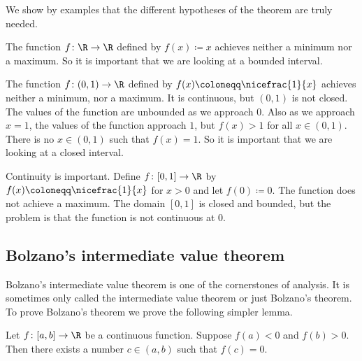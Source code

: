 We show by examples that the different hypotheses of the theorem are
truly needed.

\begin{example}
The function $f \colon \R \to \R$ defined by $f(x) \coloneqq x$
achieves neither a minimum nor a maximum.  So it is important that
we are looking at a bounded interval.
\end{example}

\begin{example}
The function $f \colon (0,1) \to \R$ defined by $f(x) \coloneqq \nicefrac{1}{x}$
achieves neither a minimum, nor a maximum.
It is continuous, but $(0,1)$ is not closed.
The values of the function are
unbounded as we approach $0$.  Also as we approach $x=1$, the values of the
function approach $1$, but $f(x) > 1$ for all $x \in (0,1)$.  There is
no $x \in (0,1)$ such that $f(x) = 1$.  So it is important that
we are looking at a closed interval.
\end{example}

\begin{example}
Continuity is important.
Define $f \colon [0,1] \to \R$ by 
$f(x) \coloneqq \nicefrac{1}{x}$ for $x > 0$ and let $f(0) \coloneqq 0$.
The function does not achieve a maximum.  The domain $[0,1]$ is closed and
bounded, but the problem is that
the function is not continuous at 0.
\end{example}

\subsection{Bolzano's intermediate value theorem}

Bolzano's intermediate value theorem is one of the cornerstones of analysis.
It is sometimes only called the intermediate value theorem or just
Bolzano's theorem.  To prove Bolzano's theorem we prove the
following simpler lemma.

\begin{lemma} \label{IVT:lemma}
Let $f \colon [a,b] \to \R$ be a continuous function.
Suppose $f(a) < 0$ and $f(b) > 0$. 
Then there exists a number $c \in (a,b)$
such that $f(c) = 0$.
\end{lemma}

